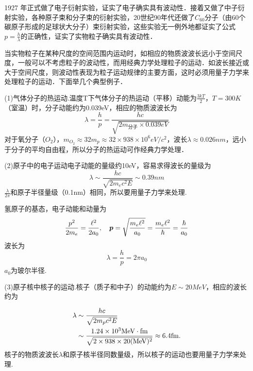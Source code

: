 1927 年正式做了电子衍射实验，证实了电子确实具有波动性．接着又做了中子衍射实验，各种原子束和分子束的衍射实验，20世纪90年代还做了$C_{60}$分子（由60个碳原子形成的足球状大分子）束衍射实验，这些实验无一例外地都证实了公式$p=\frac{h}{\lambda}$的正确性，证实了实物粒子确实具有波动性．

当实物粒子在某种尺度的空间范围内运动时，如相应的物质波波长远小于空间尺度，一般可以不考虑粒子的波动性，而用经典力学处理粒子的运动．如波长接近或大于空间尺度，则波动性表现为粒子运动规律的主要方面，这时必须用量子力学来处理粒子的运动．下面举几个典型例子．

(1)气体分子的热运动.温度T下气体分子的热运动（平移）动能为$\frac{3kT}{2}$，$T=300 \si{K}$（室温）时，分子动能约为\num{0.039}\si{eV}，相应的物质波波长为
\begin{equation*}
	\lambda=\frac{h}{p}=\frac{hc}{\sqrt{2m_{\text{分子}}\times\num{0.039}\si{eV}}}
\end{equation*}\eqshort
对于氧分子（$O_{2}$），$m_{O_{2}}\approx32m_{p}\approx32\times938\times10^{6}\si{eV/c^{2}}$，波长$\lambda\approx0.026\si{nm}$，远小于分子的平均自由程，所以分子的热运动可作经典力学处理．

(2)原子中的电子运动电子动能的量级约10\si{eV}，容易求得波长的量级为
\begin{equation*}
	\lambda\sim\frac{hc}{\sqrt{2m_{e}c^{2}E}}\sim 0.39\si{nm}
\end{equation*}\eqnormal
$\frac{\lambda}{2\pi}$和原子半径量级（0.1\si{nm}）相同，所以要用量子力学来处理.

氢原子的基态，电子动能和动量为
\begin{equation*}
	\frac{p^{2}}{2m_{e}}=\frac{\ell^{2}}{2a_{0}},\quad \boldsymbol{p}=\sqrt{\frac{m_{e}\ell^{2}}{a_{0}}}=\frac{m_{e}\ell^{2}}{\hbar}=\frac{\hbar}{a_{0}}
\end{equation*}\eqshort
波长为
\begin{equation*}
	\lambda=\frac{h}{p}=2\pi a_{0}
\end{equation*}\eqnormal
$a_{0}$为玻尔半径.

(3)原子核中核子的运动.核子（质子和中子）的动能约为$E\sim20 \si{MeV}$，相应的波长约为

\begin{equation}
	\begin{aligned}
		\lambda &\sim \frac{hc}{\sqrt{2m_{p}c^{2}E}}	\notag \\
				&\sim \frac{1.24\times10^{3} \si{MeV\cdot fm}}{\sqrt{2\times938\times20(\si{MeV})^{2}}}
				\approx 6.4 \si{fm}. \notag
	\end{aligned}
\end{equation}
核子的物质波波长$\lambda$和原子核半径同数量级，所以核子的运动也要用量子力学来处理.